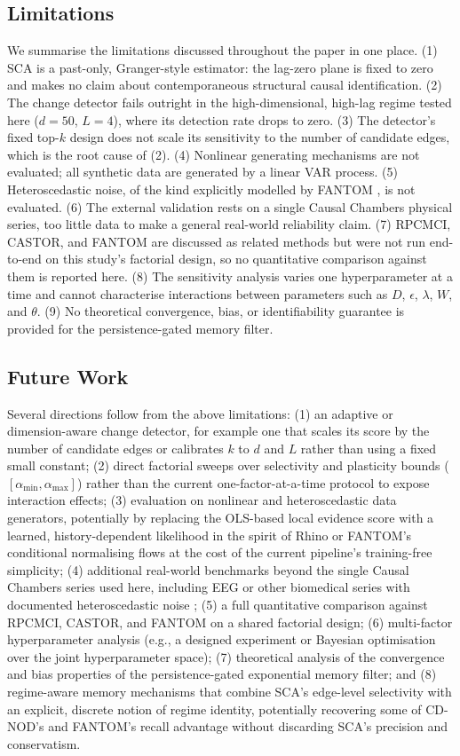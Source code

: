 \documentclass{ieeeaccess}
\newcommand{\amin}{\alpha_{\min}}
\newcommand{\amax}{\alpha_{\max}}
\begin{document}
\subsection{Limitations}
We summarise the limitations discussed throughout the paper in one place. (1) SCA is a past-only, Granger-style estimator: the lag-zero plane is fixed to zero and makes no claim about contemporaneous structural causal identification. (2) The change detector fails outright in the high-dimensional, high-lag regime tested here ($d=50$, $L=4$), where its detection rate drops to zero. (3) The detector's fixed top-$k$ design does not scale its sensitivity to the number of candidate edges, which is the root cause of (2). (4) Nonlinear generating mechanisms are not evaluated; all synthetic data are generated by a linear VAR process. (5) Heteroscedastic noise, of the kind explicitly modelled by FANTOM \cite{r8}, is not evaluated. (6) The external validation rests on a single Causal Chambers physical series, too little data to make a general real-world reliability claim. (7) RPCMCI, CASTOR, and FANTOM are discussed as related methods but were not run end-to-end on this study's factorial design, so no quantitative comparison against them is reported here. (8) The sensitivity analysis varies one hyperparameter at a time and cannot characterise interactions between parameters such as $D$, $\epsilon$, $\lambda$, $W$, and $\theta$. (9) No theoretical convergence, bias, or identifiability guarantee is provided for the persistence-gated memory filter.

\subsection{Future Work}
Several directions follow from the above limitations: (1) an adaptive or dimension-aware change detector, for example one that scales its score by the number of candidate edges or calibrates $k$ to $d$ and $L$ rather than using a fixed small constant; (2) direct factorial sweeps over selectivity and plasticity bounds ($[\amin,\amax]$) rather than the current one-factor-at-a-time protocol to expose interaction effects; (3) evaluation on nonlinear and heteroscedastic data generators, potentially by replacing the OLS-based local evidence score with a learned, history-dependent likelihood in the spirit of Rhino \cite{r4} or FANTOM's conditional normalising flows \cite{r8} at the cost of the current pipeline's training-free simplicity; (4) additional real-world benchmarks beyond the single Causal Chambers series used here, including EEG or other biomedical series with documented heteroscedastic noise \cite{r8,r13}; (5) a full quantitative comparison against RPCMCI, CASTOR, and FANTOM on a shared factorial design; (6) multi-factor hyperparameter analysis (e.g., a designed experiment or Bayesian optimisation over the joint hyperparameter space); (7) theoretical analysis of the convergence and bias properties of the persistence-gated exponential memory filter; and (8) regime-aware memory mechanisms that combine SCA's edge-level selectivity with an explicit, discrete notion of regime identity, potentially recovering some of CD-NOD's and FANTOM's recall advantage without discarding SCA's precision and conservatism.
\end{document}
